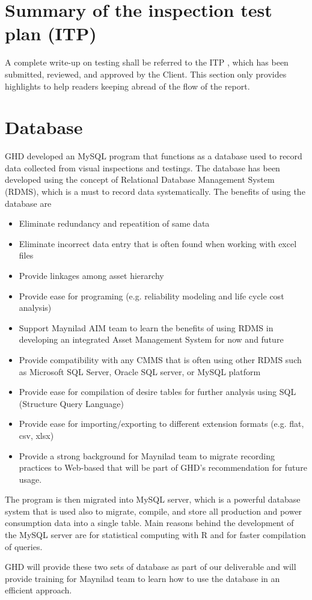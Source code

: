 \section{Summary of the inspection test plan (ITP)}
\label{231}
A complete write-up on testing shall be referred to the ITP \cite{GHD2018n}, which has been submitted, reviewed, and approved by the Client. This section only provides highlights to help readers keeping abread of the flow of the report.




\section{Database}
\label{24}
GHD developed an MySQL program that functions as a database used to record data collected from visual inspections and testings. The database has been developed using the concept of Relational Database Management System (RDMS), which is a must to record data systematically. The benefits of using the database are

\begin{itemize}
\item Eliminate redundancy and repeatition of same data
\item Eliminate incorrect data entry that is often found when working with excel files
\item Provide linkages among asset hierarchy
\item Provide ease for programing (e.g. reliability modeling and life cycle cost analysis)
\item Support Maynilad AIM team to learn the benefits of using RDMS in developing an integrated Asset Management System for now and future
\item Provide compatibility with any CMMS that is often using other RDMS such as Microsoft SQL Server, Oracle SQL server, or MySQL platform
\item Provide ease for compilation of desire tables for further analysis using SQL (Structure Query Language)
\item Provide ease for importing/exporting to different extension formats (e.g. flat, csv, xlsx)
\item Provide a strong background for Maynilad team to migrate recording practices to Web-based that will be part of GHD's recommendation for future usage.
\end{itemize}

The program is then migrated into MySQL server, which is a powerful database system that is used also to migrate, compile, and store all production and power consumption data into a single table. Main reasons behind the development of the MySQL server are for statistical computing with R and for faster compilation of queries.

GHD will provide these two sets of database as part of our deliverable and will provide training for Maynilad team to learn how to use the database in an efficient approach.




